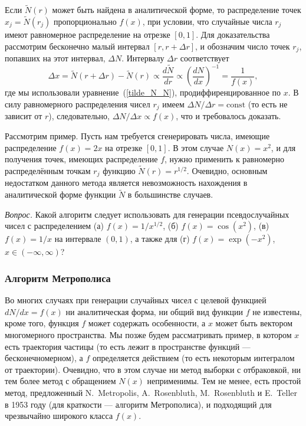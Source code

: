 \documentclass{book}
\begin{document}
Если $\tilde N(r)$ может быть найдена в аналитической форме, то распределение точек $x_j = \tilde
N(r_j)$ пропорционально $f(x)$, при условии, что случайные числа $r_j$ имеют равномерное
распределение на отрезке $[0, 1]$. Для доказательства рассмотрим бесконечно малый интервал $[r, r +
\Delta r]$, и обозначим число точек $r_j$, попавших на этот интервал, $\Delta N$.
Интервалу $\Delta r$ соответствует
\begin{equation}
    \Delta x = \tilde N(r + \Delta r) - \tilde N(r) \propto \frac{d \tilde N}{dr} \propto \left(
    \frac{dN}{dx} \right)^{-1} = \frac{1}{f(x)},
\end{equation}
где мы использовали уравнение~(\ref{tilde_N_N}), продиффиренцированное по $x$.
В силу равномерного распределения чисел $r_j$ имеем $\Delta N /
\Delta r = \mathrm{const}$ (то есть не зависит от $r$), следовательно, $\Delta N / \Delta x \propto f(x)$, что и требовалось
доказать.

Рассмотрим пример. Пусть нам требуется сгенерировать числа, имеющие распределение $f(x) = 2 x$ на
отрезке $[0, 1]$. В этом случае $N(x) = x^2$, и для получения точек, имеющих распределение $f$,
нужно применить к равномерно распределённым точкам $r_j$ функцию $\tilde N(r) = r^{1/2}$. Очевидно,
основным недостатком данного метода является невозможность нахождения в аналитической форме функции
$\tilde N$ в большинстве случаев.

\textit{Вопрос.} Какой алгоритм следует использовать для генерации псевдослучайных чисел с
распределением (а) $f(x) = 1 / x^{1/2}$, (б) $f(x) = \cos (x^2)$, (в) $f(x) = 1 / x$  на интервале
$(0, 1)$, а также для (г) $f(x) = \exp(-x^2)$, $x \in (-\infty, \infty)$?

\subsubsection{Алгоритм Метрополиса}

Во многих случаях при генерации случайных чисел с целевой функцией $dN/dx = f(x)$ ни аналитическая
форма, ни общий вид функции $f$ не известены, кроме того, функция $f$ может содержать особенности,
а $x$ может быть вектором многомерного пространства. Мы позже будем
рассматривать пример, в котором $x$ есть траектория частицы (то есть лежит в пространстве функций
--- бесконечномерном), а $f$ определяется действием (то есть некоторым интегралом от траектории).
Очевидно, что в этом случае ни метод выборки с отбраковкой, ни тем более метод с обращением $N(x)$
неприменимы. Тем не менее, есть простой метод, предложенный N.~Metropolis, A.~Rosenbluth,
M.~Rosenbluth и E.~Teller в 1953 году (для краткости --- алгоритм Метрополиса), и подходящий для
чрезвычайно широкого класса $f(x)$.
\end{document}
